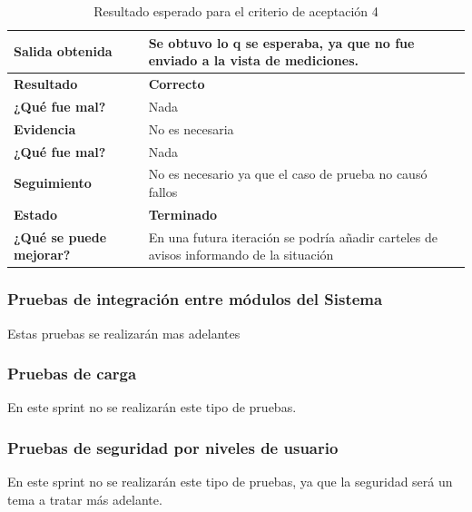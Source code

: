 {\scriptsize
	\begin{table}[h]

	\centering
	\begin{tabular}{|l|p{10cm}|}
	    \hline 
	    \textbf{Salida obtenida}&Se obtuvo lo q se esperaba, ya que no fue enviado a la vista de mediciones.\\ \hline
	    \textbf{Resultado}& \textbf{Correcto}\\ \hline
        \textbf{¿Qué fue mal?}& Nada\\ \hline        
        \textbf{Evidencia}&No es necesaria  \\ \hline
        \textbf{¿Qué fue mal?}& Nada\\ \hline      
        \textbf{Seguimiento}& No es necesario ya que el caso de prueba no causó fallos \\ \hline
        \textbf{Estado}& \textbf{Terminado}\\ \hline        
        \textbf{¿Qué se puede mejorar?}& En una futura iteración se podría añadir carteles de avisos informando de la situación\\ \hline              
	    \end{tabular}
        \caption{Resultado esperado para el criterio de aceptación 4}
   	\end{table}
	}


\clearpage
\subsubsection{Pruebas de integración entre módulos del Sistema}
Estas pruebas se realizarán mas adelantes
\subsubsection{Pruebas de carga}
En este sprint no se realizarán este tipo de pruebas.
\subsubsection{Pruebas de seguridad por niveles de usuario}
En este sprint no se realizarán este tipo de pruebas, ya que la seguridad será un tema a tratar más adelante.

